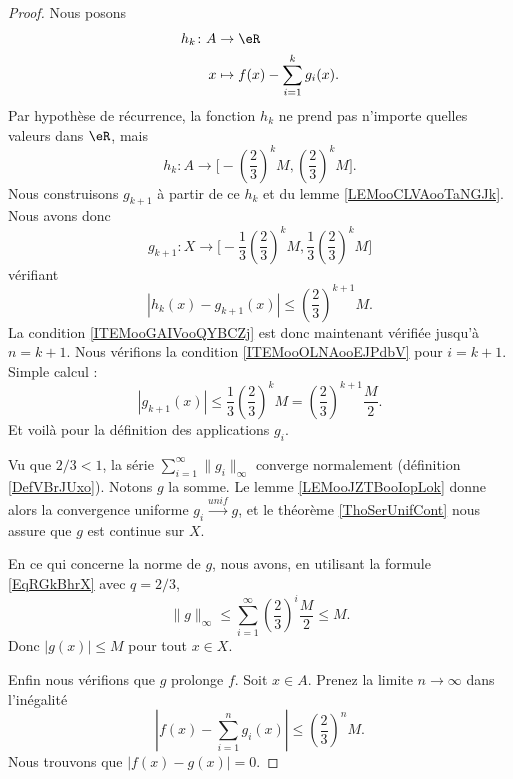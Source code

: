 \begin{proof}
	Nous posons
	\begin{equation}
		\begin{aligned}
			h_k\colon A & \to \eR                          \\
			x           & \mapsto f(x)-\sum_{i=1}^kg_i(x).
		\end{aligned}
	\end{equation}
	Par hypothèse de récurrence, la fonction \( h_k\) ne prend pas n'importe quelles valeurs dans \( \eR\), mais
	\begin{equation}
		h_k\colon A\to \mathopen\big[  -\left( \frac{ 2 }{ 3 } \right)^kM  , \left( \frac{ 2 }{ 3 } \right)^kM \mathclose\big].
	\end{equation}
	Nous construisons \( g_{k+1}\) à partir de ce \( h_k\) et du lemme \ref{LEMooCLVAooTaNGJk}. Nous avons donc
	\begin{equation}
		g_{k+1}\colon X\to \mathopen\Big[  -\frac{1}{ 3 }\left( \frac{ 2 }{ 3 } \right)^kM  , \frac{1}{ 3 }\left( \frac{ 2 }{ 3 } \right)^kM \mathclose\Big]
	\end{equation}
	vérifiant
	\begin{equation}
		| h_k(x)-g_{k+1}(x) |\leq \left( \frac{ 2 }{ 3 } \right)^{k+1}M.
	\end{equation}
	La condition \ref{ITEMooGAIVooQYBCZj} est donc maintenant vérifiée jusqu'à \( n=k+1\). Nous vérifions la condition \ref{ITEMooOLNAooEJPdbV} pour \( i=k+1\). Simple calcul :
	\begin{equation}
		| g_{k+1}(x) |\leq \frac{1}{ 3 }\left( \frac{ 2 }{ 3 } \right)^kM=\left( \frac{ 2 }{ 3 } \right)^{k+1}\frac{ M }{ 2 }.
	\end{equation}
	Et voilà pour la définition des applications \( g_i\).

	Vu que \( 2/3<1\), la série \( \sum_{i=1}^{\infty}\| g_i \|_{\infty}\) converge normalement (définition \ref{DefVBrJUxo}). Notons \( g\) la somme. Le lemme \ref{LEMooJZTBooIopLok} donne alors la convergence uniforme \( g_i\stackrel{unif}{\longrightarrow}g\), et le théorème \ref{ThoSerUnifCont} nous assure que \( g\) est continue sur \( X\).

	En ce qui concerne la norme de \( g\), nous avons, en utilisant la formule \eqref{EqRGkBhrX} avec \( q=2/3\),
	\begin{equation}
		\| g \|_{\infty}\leq \sum_{i=1}^{\infty}\left( \frac{ 2 }{ 3 } \right)^i\frac{ M }{2}\leq M.
	\end{equation}
	Donc \( | g(x) |\leq M\) pour tout \( x\in X\).

	Enfin nous vérifions que \( g\) prolonge \( f\). Soit \( x\in A\). Prenez la limite \( n\to \infty\) dans l'inégalité
	\begin{equation}
		| f(x)-\sum_{i=1}^ng_i(x) |\leq \left( \frac{ 2 }{ 3 } \right)^nM.
	\end{equation}
	Nous trouvons que \( | f(x)-g(x) |=0\).
\end{proof}

